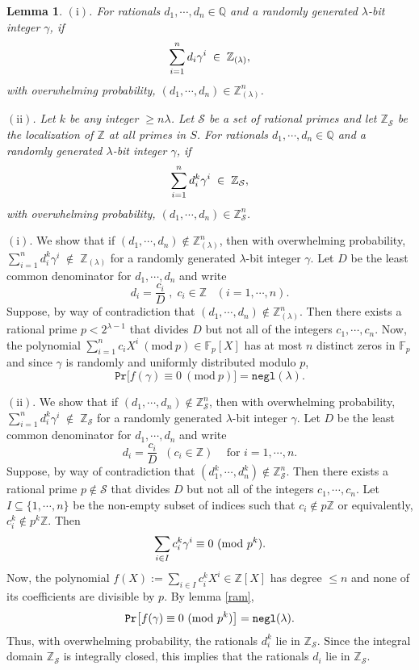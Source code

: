 \documentclass[11pt, lettersize, notitlepage, leqno, footskip=0.6cm]{article}
\newcommand{\bz}{\mathbb Z}
\newcommand{\bq}{\mathbb Q}
\newcommand{\bFp}{\mathbb{F}_p}
\newcommand{\slim}{\sum\limits}
\newcommand{\ttt}{\texttt}
\newcommand{\negl}{\ttt{{negl}}}
\newcommand{\mc}{\mathcal}
\newcommand{\mr}{\mathrm}
\newcommand{\lam}{\lambda}
\newcommand{\bzlam}{\bz_{(\lam)}}
\newcommand{\bzs}{\bz_{\mc{S}}}
\newcommand{\sub}{\subseteq}
\newcommand{\vs}{\vspace{-0.15cm}}
\newcommand{\noin}{\noindent}
\newcommand{\op}{overwhelming probability}
\newcommand{\Mod}[1]{\ (\mathrm{mod}\ #1)}
\newtheorem{Lem}[Thm]{Lemma}
\numberwithin{equation}{section}
\begin{document}
\vspace{0.15cm}

\begin{Lem} \label{integers} $\mr{(i)}$. For rationals $d_1,\cdots, d_n\in \bq$ and a randomly generated $\lam$-bit integer $\gamma$, if \vs $$\sum_{i=1}^n d_i\gamma^i\; \in \;\bzlam, \vs $$ with \op, $(d_1,\cdots, d_n)\in \bzlam^n$.\vspace{0.1cm}

\noin $\mr{(ii)}$. Let $k$ be any integer $\geq n\lam$. Let $\mc{S}$ be a set of rational primes and let $\bz_{\mc{S}}$ be the localization of $\bz$ at all primes in $S$. For rationals $d_1,\cdots, d_n\in \bq$ and a randomly generated $\lam$-bit integer $\gamma$, if \vs $$ \sum_{i=1}^n d_i^{k}\gamma^i\; \in \;\bz_{\mc{S}}, \vs $$ with \op, $(d_1,\cdots, d_n)\in \bz_{\mc{S}}^n$.
\end{Lem}

\begin{prf} $\mr{(i)}$. We show that if $(d_1,\cdots,d_n)\notin \bzlam^n$, then with \op, $\sum\limits_{i=1}^n d_i^{k}\gamma^i\; \notin \;\bzlam$ for a randomly generated $\lam$-bit integer $\gamma$. Let $D$ be the least common denominator for $d_1,\cdots, d_n$ and write \vs $$d_i = \frac{c_i}{D}\;,\; c_i\in\bz\; \;\;(i=1,\cdots, n).$$ Suppose, by way of contradiction that $(d_1,\cdots, d_n )\notin \bzlam^n$. Then there exists a rational prime $p < 2^{\lam-1}$ that divides $D$ but not all of the integers $c_1,\cdots,c_n$. Now, the polynomial $\sum_{i=1}^n c_iX^i\Mod{p} \in \bFp[X]$ has at most $n$ distinct zeros in $\bFp$ and since $\gamma$ is randomly and uniformly distributed modulo $p$, \vs $$\ttt{Pr}\big[f(\gamma)\equiv 0\Mod{p} \big] = \negl(\lam).$$

\vspace{0.15cm} 

\noin $\mr{(ii)}$. We show that if $(d_1,\cdots,d_n)\notin \bzs^n$, then with \op, $\sum_{i=1}^n d_i^{k}\gamma^i\; \notin \;\bz_{\mc{S}}$ for a randomly generated $\lam$-bit integer $\gamma$. Let $D$ be the least common denominator for $d_1,\cdots, d_n$ and write \vs $$d_i = \frac{c_i}{D}\;\; (c_i\in \bz)\;\;\; \text{ for } i=1,\cdots, n. $$ Suppose, by way of contradiction that $(d_1^{k},\cdots, d_n^{k} )\notin \bz_{\mc{S}}^n$. Then there exists a rational prime $p\notin \mc{S}$ that divides $D$ but not all of the integers $c_1,\cdots,c_n$. Let $I\sub \{1,\cdots,n  \}$ be the non-empty subset of indices such that $c_i\notin p\bz$ or equivalently, $c_i^{k}\notin p^{k}\bz$. Then \vs $$\slim_{i\in I} c_i^{k}\gamma^i \equiv 0\Mod{p^{k}}. \vs $$ Now, the polynomial $f(X):= \slim_{i\in I} c_i^{k} X^i\in \bz[X]$ has degree $\leq n$ and none of its coefficients are divisible by $p$. By lemma \ref{ram}, \vs $$\ttt{Pr}\big[f(\gamma)\equiv 0\Mod{p^{k}} \big] = \negl(\lam).\vs $$ Thus, with \op, the rationals $d_i^{k}$ lie in $\bz_{\mc{S}}$. Since the integral domain $\bz_{\mc{S}}$ is integrally closed, this implies that the rationals $d_i$ lie in $\bz_{\mc{S}}$.\end{prf}
\end{document}
